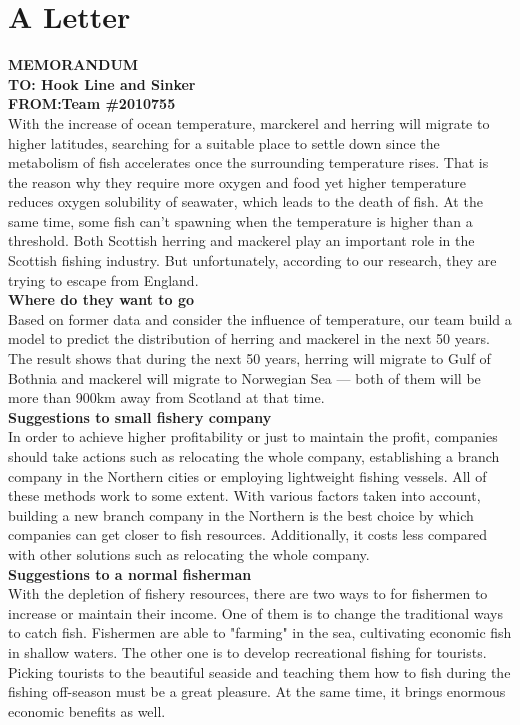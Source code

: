\documentclass{mcmthesis}
\begin{document}
\section{A Letter}
\textbf{MEMORANDUM}~\\
\textbf{TO: Hook Line and Sinker}\\
\textbf{FROM:Team \#2010755}\\

With the increase of ocean temperature, marckerel and herring will migrate to higher latitudes, searching for a suitable place to settle down since the metabolism of fish accelerates once the surrounding temperature rises. That is the reason why they require more oxygen and food yet higher temperature reduces oxygen solubility of seawater, which leads to the death of fish. At the same time, some fish can’t spawning when the temperature is higher than a threshold. Both Scottish herring and mackerel play an important role in the Scottish fishing industry. But unfortunately, according to our research, they are trying to escape from England.\\

\textbf{Where do they want to go}\\
Based on former data and consider the influence of temperature, our team build a model to predict the distribution of herring and mackerel in the next 50 years. The result shows that during the next 50 years, herring will migrate to Gulf of Bothnia and mackerel will migrate to Norwegian Sea --- both of them will be more than 900km away from Scotland at that time.\\

\textbf{Suggestions to small fishery company}\\
In order to achieve higher profitability or just to maintain the profit, companies should take actions such as relocating the whole company, establishing a branch company in the Northern cities or employing lightweight fishing vessels. All of these methods work to some extent. With various factors taken into account, building a new branch company in the Northern is the best choice by which companies can get closer to fish resources. Additionally, it costs less compared with other solutions such as relocating the whole company.\\

\textbf{Suggestions to a normal fisherman}\\
With the depletion of fishery resources, there are two ways to for fishermen to increase or maintain their income. One of them is to change the traditional ways to catch fish. Fishermen are able to "farming" in the sea, cultivating economic fish in shallow waters. The other one is to develop recreational fishing for tourists. Picking tourists to the beautiful seaside and teaching them how to fish during the fishing off-season must be a great pleasure. At the same time, it brings enormous economic benefits as well.\\
\end{document}

